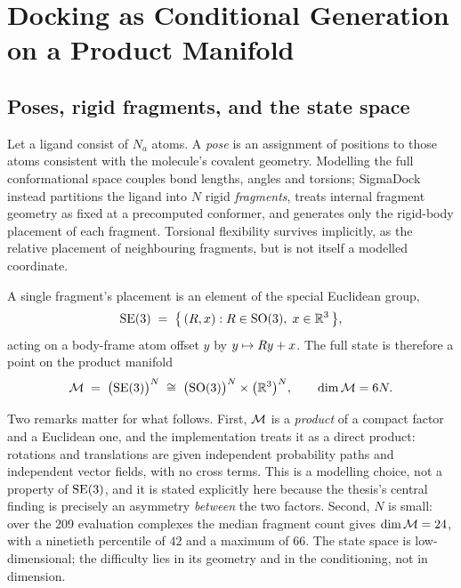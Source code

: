 \chapter{Docking as Conditional Generation on a Product Manifold}
\label{ch:problem}

\section{Poses, rigid fragments, and the state space}
\label{sec:state-space}

Let a ligand consist of $N_a$ atoms. A \emph{pose} is an assignment of
positions to those atoms consistent with the molecule's covalent geometry.
Modelling the full conformational space couples bond lengths, angles and
torsions; SigmaDock instead partitions the ligand into $N$ rigid
\emph{fragments}, treats internal fragment geometry as fixed at a
precomputed conformer, and generates only the rigid-body placement of each
fragment. Torsional flexibility survives implicitly, as the relative placement
of neighbouring fragments, but is not itself a modelled coordinate.

A single fragment's placement is an element of the special Euclidean group,
\begin{equation}
  \mathrm{SE}(3) \;=\; \bigl\{\, (R, x) : R \in \mathrm{SO}(3),\; x \in \mathbb{R}^3 \,\bigr\},
\end{equation}
acting on a body-frame atom offset $y$ by $y \mapsto R y + x$. The full
state is therefore a point on the product manifold
\begin{equation}
  \mathcal{M} \;=\; \bigl(\mathrm{SE}(3)\bigr)^{N}
  \;\cong\; \bigl(\mathrm{SO}(3)\bigr)^{N} \times \bigl(\mathbb{R}^{3}\bigr)^{N},
  \qquad \dim \mathcal{M} = 6N .
  \label{eq:state-space}
\end{equation}

Two remarks matter for what follows. First, $\mathcal{M}$ is a \emph{product} of a
compact factor and a Euclidean one, and the implementation treats it as a
direct product: rotations and translations are given independent probability
paths and independent vector fields, with no cross terms. This is a modelling
choice, not a property of $\mathrm{SE}(3)$, and it is stated explicitly here because
the thesis's central finding is precisely an asymmetry \emph{between} the two
factors. Second, $N$ is small: over the 209 evaluation complexes the median
fragment count gives $\dim\mathcal{M} = 24$, with a ninetieth percentile of $42$ and
a maximum of $66$. The state space is low-dimensional; the difficulty lies in
its geometry and in the conditioning, not in dimension.

